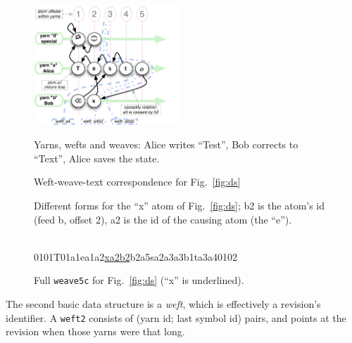 \documentclass{sig-alternate}
\begin{document}
\begin{figure}[t]
\includegraphics[width=0.49\textwidth]{feedsnweaves-5.pdf}
\caption{Yarns, wefts and weaves: Alice writes ``Test'', Bob corrects to ``Text'', Alice saves the state. \label{fig:ds} }

\caption{Weft-weave-text correspondence for Fig.~\ref{fig:ds} \label{fig:wwt}}

\caption {Different forms for the ``x'' atom of Fig.~\ref{fig:ds}; b2 is the atom's id (feed b, offset 2), a2 is the id of the causing atom (the ``e''). \label{fig:forms}}
~\\
{ {\aum}0101{T}01a1{e}a1a2{\underline{xa2b2}}{\zero}b2a5{s}a2a3{\bsp}a3b1{t}a3a4{\eoa}0102 }
\caption{ Full {\tt weave5c} for Fig.~\ref{fig:ds} (``x'' is underlined). \label{fig:w5c} }
\end{figure}
The second basic data structure is a \emph{weft}, which is effectively a revision's identifier.
A {\tt weft2} consists of (yarn id; last symbol id) pairs, and points at the revision when those yarns were that long. 
\end{document}
